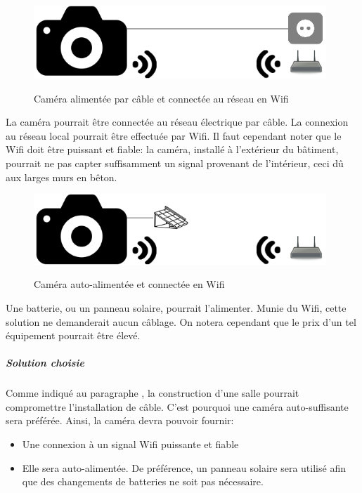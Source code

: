 \begin{figure}[H]
    \includegraphics[width=110mm]{img/conception/cam_con_3.png}
    \label{fig:cam_connection_3}
    \centering
    \caption{Caméra alimentée par câble et connectée au réseau en Wifi}
\end{figure}

La caméra pourrait être connectée au réseau électrique par câble. La connexion au réseau local pourrait être effectuée par Wifi. Il faut cependant noter que le Wifi doit être puissant et fiable: la caméra, installé à l'extérieur du bâtiment, pourrait ne pas capter suffisamment un signal provenant de l'intérieur, ceci dû aux larges murs en bêton. 

\begin{figure}[H]
    \includegraphics[width=110mm]{img/conception/cam_con_4.png}
    \label{fig:cam_connection_4}
    \centering
    \caption{Caméra auto-alimentée et connectée en Wifi}
\end{figure}

Une batterie, ou un panneau solaire, pourrait l'alimenter. Munie du Wifi, cette solution ne demanderait aucun câblage. On notera cependant que le prix d'un tel équipement pourrait être élevé.

\subparagraph{Solution choisie}

Comme indiqué au paragraphe , la construction d'une salle pourrait compromettre l'installation de câble. C'est pourquoi une caméra auto-suffisante sera préférée. Ainsi, la caméra devra pouvoir fournir:
\begin{itemize}
    \item Une connexion à un signal Wifi puissante et fiable
    \item Elle sera auto-alimentée. De préférence, un panneau solaire sera utilisé afin que des changements de batteries ne soit pas nécessaire.
\end{itemize}

